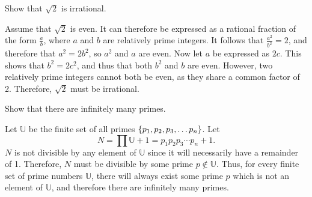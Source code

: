 \documentclass{homework}
\begin{document}
	
\begin{problem}
	Show that $\sqrt{2}$ is irrational.
\end{problem}
\begin{solution}
	Assume that $\sqrt{2}$ is even. It can therefore be expressed as a rational fraction of the form $\frac{a}{b}$, where $a$ and $b$ are relatively prime integers. It follows that $\frac{a^2}{b^2} = 2$, and therefore that $a^2 = 2b^2$, so $a^2$ and $a$ are even. Now let $a$ be expressed as $2c$. This shows that $b^2 = 2c^2$, and thus that both $b^2$ and $b$ are even. However, two relatively prime integers cannot both be even, as they share a common factor of 2. Therefore, $\sqrt{2}$ must be irrational. 
\end{solution}

\begin{problem}
	Show that there are infinitely many primes.
\end{problem}
\begin{solution}
	Let $\mathbb{U}$ be the finite set of all primes $\qty{p_1, p_2, p_3, \dots p_n}$. Let
	\[
		N = \prod \mathbb{U} + 1 = p_1p_2p_3\cdots p_n + 1\text{.}
	\]
	$N$ is not divisible by any element of $\mathbb{U}$ since it will necessarily have a remainder of 1. Therefore, $N$ must be divisible by some prime $p \not\in \mathbb{U}$. Thus, for every finite set of prime numbers $\mathbb{U}$, there will always exist some prime $p$ which is not an element of $\mathbb{U}$, and therefore there are infinitely many primes.
\end{solution}
\end{document}
